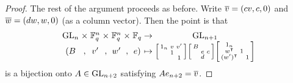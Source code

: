 \begin{proof}
    The rest of the argument proceeds as before. Write $\overline{v}=(cv,c,0)$ and $\overline{w}=(dw,w,0)$ (as a column vector). Then the point is that
    \[\arraycolsep=1.4pt\begin{array}{ccccccccccccc}
        \GL_n &\times& \FF_q^n &\times& \FF_q^n &\times& \FF_q &\to& \GL_{n+1} \\
        (B &,& v' &,& w' &,& e) &\mapsto& \begin{bsmallmatrix}
            1_n & v & v' \\
            & 1 \\ && 1
        \end{bsmallmatrix}\begin{bsmallmatrix}
            B \\ & e & c \\ & d
        \end{bsmallmatrix}\begin{bsmallmatrix}
            1_n \\
            w^\intercal & 1 \\ (w')^\intercal && 1
        \end{bsmallmatrix}
    \end{array}\]
    is a bijection onto $A\in\mathrm{GL}_{n+2}$ satisfying $Ae_{n+2}=\overline{v}$.
    

\end{proof}
